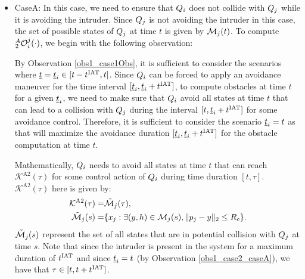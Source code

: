 \begin{itemize}[leftmargin=*] 
\item \label{sec:intruderObs_case2_caseA} CaseA: In this case, we need to ensure that $Q_i$ does not collide with $Q_j$ while it is avoiding the intruder. Since $Q_j$ is not avoiding the intruder in this case, the set of possible states of $Q_j$ at time $t$ is given by $\mathcal{M}_j(t)$. To compute $_2^A\mathcal{O}_i^j(\cdot)$, we begin with the following observation: 
\begin{observation} \label{obs1_case2_caseA}
By Observation \ref{obs1_case1Obs}, it is sufficient to consider the scenarios where $\underline{t} = \underline{t}_i \in [t-t^\text{IAT}, t]$. Since $Q_i$ can be forced to apply an avoidance maneuver for the time interval $[\underline{t}_i, \underline{t}_i+t^\text{IAT}]$, to compute obstacles at time $t$ for a given $\underline{t}_i$, we need to make sure that $Q_i$ avoid all states at time $t$ that can lead to a collision with $Q_j$ during the interval $[t, \underline{t}_i+t^\text{IAT}]$ for some avoidance control. Therefore, it is sufficient to consider the scenario $\underline{t}_i = t$ as that will maximize the avoidance duration $[\underline{t}_i, \underline{t}_i+t^\text{IAT}]$ for the obstacle computation at time $t$.  
\end{observation}

Mathematically, $Q_i$ needs to avoid all states at time $t$ that can reach $\mathcal{K}^{\text{A2}}(\tau)$ for some control action of $Q_i$ during time duration $[t, \tau]$. $\mathcal{K}^{\text{A2}}(\tau)$ here is given by:
\begin{equation}
\begin{aligned}
\mathcal{K}^{\text{A2}}(\tau) = & \tilde{\mathcal{M}}_j(\tau),\\
\tilde{\mathcal{M}}_j(s) = & \{x_j: \exists (y, h) \in \mathcal{M}_j(s), \|p_j - y\|_2 \le R_c \}.
\end{aligned}
\end{equation}
$\tilde{\mathcal{M}}_j(s)$ represent the set of all states that are in potential collision with $Q_j$ at time $s$. Note that since the intruder is present in the system for a maximum duration of $t^\text{IAT}$ and since $\underline{t}_i = t$ (by Observation \ref{obs1_case2_caseA}), we have that $\tau \in [t, t+t^\text{IAT}]$. 


\end{itemize}
